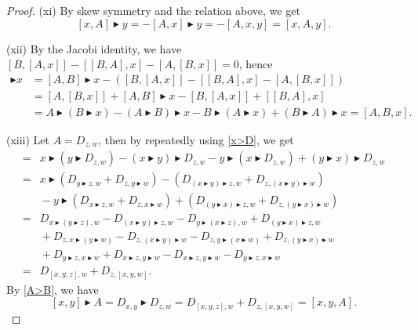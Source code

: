 \documentclass[10pt,a4paper]{amsart}
\numberwithin{equation}{section}
\begin{document}
\begin{proof}
(xi) By skew symmetry and the relation above, we get
 \[
 [x,A]\blacktriangleright y = - [A,x] \blacktriangleright y = -[A,x,y] = [x,A,y].
 \]

(xii) By the Jacobi identity, we have $[B,[A,x]] - [[B,A],x] - [A,[B,x]]=0$, hence
 \begin{align*}
 [A,B] \blacktriangleright x & = [A,B]\blacktriangleright x - ([B,[A,x]] - [[B,A],x] - [A,[B,x]] ) \\
 & = [A,[B,x]] + [A,B]\blacktriangleright x - [B,[A,x]] + [[B,A],x] \\
 & = A \blacktriangleright (B \blacktriangleright x ) - (A \blacktriangleright B) \blacktriangleright x - B \blacktriangleright (A \blacktriangleright x) + (B \blacktriangleright A) \blacktriangleright x
 = [A,B,x].
 \end{align*}

(xiii) Let $A = D_{z,w}$, then by repeatedly using \eqref{x>D}, we get
 \begin{align*}
 [x,y,A] ={}& x \blacktriangleright (y \blacktriangleright D_{z,w}) - (x \blacktriangleright y) \blacktriangleright D_{z,w} - y \blacktriangleright (x \blacktriangleright D_{z,w}) + (y \blacktriangleright x) \blacktriangleright D_{z,w} \\
 ={}& x\blacktriangleright (D_{y\blacktriangleright z,w} + D_{z,y \blacktriangleright w} ) - (D_{(x\blacktriangleright y) \blacktriangleright z,w} + D_{z, (x\blacktriangleright y) \blacktriangleright w} ) \\
 &{} - y \blacktriangleright (D_{x\blacktriangleright z,w} + D_{z,x \blacktriangleright w} ) + (D_{(y\blacktriangleright x) \blacktriangleright z,w} + D_{z, (y\blacktriangleright x) \blacktriangleright w} ) \\
 ={}& D_{x \blacktriangleright (y \blacktriangleright z),w} - D_{(x\blacktriangleright y) \blacktriangleright z,w} - D_{y \blacktriangleright (x\blacktriangleright z),w} + D_{(y\blacktriangleright x) \blacktriangleright z,w} \\
 &{}+ D_{z, x \blacktriangleright (y \blacktriangleright w)} - D_{z, (x\blacktriangleright y) \blacktriangleright w} - D_{z,y \blacktriangleright (x \blacktriangleright w)} + D_{z, (y\blacktriangleright x) \blacktriangleright w} \\
 &{}+ D_{y\blacktriangleright z, x\blacktriangleright w} + D_{x \blacktriangleright z, y \blacktriangleright w} - D_{x \blacktriangleright z, y \blacktriangleright w} - D_{y \blacktriangleright z, x \blacktriangleright w} \\
 ={}& D_{[x,y,z],w} + D_{z,[x,y,w]}.
 \end{align*}
 By \eqref{A>B}, we have
 \[
 [x,y] \blacktriangleright A = D_{x,y} \blacktriangleright D_{z,w} = D_{[x,y,z],w} + D_{z,[x,y,w]} = [x,y,A].
 \]


\end{proof}
\end{document}
